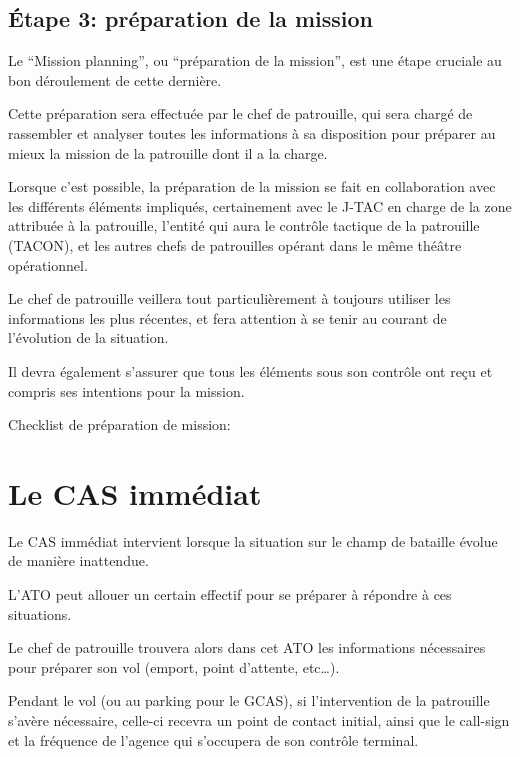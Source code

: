 \subsection{Étape 3: préparation de la mission}

\begin{center}
\end{center}

\e
    \item Le “Mission planning”, ou “préparation de la mission”, est une étape cruciale au bon déroulement de cette dernière.
    \item Cette préparation sera effectuée par le chef de patrouille, qui sera chargé de rassembler et analyser toutes les informations à sa disposition pour préparer au mieux la mission de la patrouille dont il a la charge.
    \item Lorsque c’est possible, la préparation de la mission se fait en collaboration avec les différents éléments impliqués, certainement avec le J-TAC en charge de la zone attribuée à la patrouille, l’entité qui aura le contrôle tactique de la patrouille (TACON), et les autres chefs de patrouilles opérant dans le même théâtre opérationnel.
    \item Le chef de patrouille veillera tout particulièrement à toujours utiliser les informations les plus récentes, et fera attention à se tenir au courant de l’évolution de la situation.
    \item Il devra également s’assurer que tous les éléments sous son contrôle ont reçu et compris ses intentions pour la mission.
    \item Checklist de préparation de mission: 
\ed

\section{Le CAS immédiat}

\e
    \item Le CAS immédiat intervient lorsque la situation sur le champ de bataille évolue de manière inattendue.
    \item L’ATO peut allouer un certain effectif pour se préparer à répondre à ces situations.
    \item Le chef de patrouille trouvera alors dans cet ATO les informations nécessaires pour préparer son vol (emport, point d’attente, etc…).
    \item
    Pendant le vol (ou au parking pour le GCAS), si l’intervention de la patrouille s’avère nécessaire, celle-ci recevra un point de contact initial, ainsi que le call-sign et la fréquence de l’agence qui s’occupera de son contrôle terminal.
\ed





